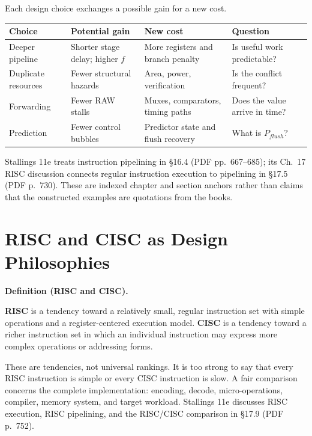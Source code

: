 \documentclass[11pt]{article}
\newenvironment{definitionbox}[1]{%
  \par\noindent\textbf{Definition (#1).}\ \itshape
}{\par\vspace{0.3em}}
\begin{document}
Each design choice exchanges a possible gain for a new cost.
\begin{center}
\small
\begin{tabular}{@{}>{\raggedright\arraybackslash}p{2.8cm}>{\raggedright\arraybackslash}p{3.3cm}>{\raggedright\arraybackslash}p{3.3cm}>{\raggedright\arraybackslash}p{2.8cm}@{}}
\toprule
\textbf{Choice} & \textbf{Potential gain} & \textbf{New cost} & \textbf{Question}\\
\midrule
Deeper pipeline & Shorter stage delay; higher $f$ & More registers and branch penalty & Is useful work predictable?\\
Duplicate resources & Fewer structural hazards & Area, power, verification & Is the conflict frequent?\\
Forwarding & Fewer RAW stalls & Muxes, comparators, timing paths & Does the value arrive in time?\\
Prediction & Fewer control bubbles & Predictor state and flush recovery & What is $P_{flush}$?\\
\bottomrule
\end{tabular}
\end{center}
Stallings 11e treats instruction pipelining in §16.4 (PDF pp.~667--685); its
Ch.~17 RISC discussion connects regular instruction execution to pipelining in
§17.5 (PDF p.~730). These are indexed chapter and section anchors rather than
claims that the constructed examples are quotations from the books.

\section{RISC and CISC as Design Philosophies}
\label{sec:risc-cisc}

\begin{definitionbox}{RISC and CISC}
\textbf{RISC} is a tendency toward a relatively small, regular instruction set
with simple operations and a register-centered execution model. \textbf{CISC}
is a tendency toward a richer instruction set in which an individual
instruction may express more complex operations or addressing forms.
\end{definitionbox}

These are tendencies, not universal rankings. It is too strong to say that
every RISC instruction is simple or every CISC instruction is slow. A fair
comparison concerns the complete implementation: encoding, decode,
micro-operations, compiler, memory system, and target workload. Stallings
11e discusses RISC execution, RISC pipelining, and the RISC/CISC comparison in
§17.9 (PDF p.~752).
\end{document}
